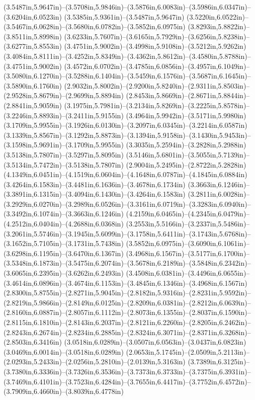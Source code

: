 (3.5487in,5.9647in)--(3.5708in,5.9846in)--(3.5876in,6.0083in)--(3.5986in,6.0347in)--(3.6204in,6.0523in) (3.5385in,5.9361in)--(3.5487in,5.9647in) (3.5220in,6.0522in)--(3.5467in,6.0628in)--(3.5680in,6.0782in)--(3.5852in,6.0975in) (3.8293in,5.8822in)--(3.8511in,5.8998in) (3.6233in,5.7607in)--(3.6165in,5.7929in)--(3.6256in,5.8238in)--(3.6277in,5.8553in) (3.4751in,5.9002in)--(3.4998in,5.9108in)--(3.5212in,5.9262in) (3.4084in,5.8111in)--(3.4252in,5.8349in)--(3.4362in,5.8612in)--(3.4580in,5.8788in)--(3.4751in,5.9002in) (3.4572in,6.0702in)--(3.4785in,6.0856in)--(3.4957in,6.1049in)--(3.5080in,6.1270in)--(3.5288in,6.1404in)--(3.5459in,6.1576in)--(3.5687in,6.1645in)--(3.5890in,6.1760in) (2.9032in,5.8002in)--(2.9200in,5.8240in)--(2.9311in,5.8503in)--(2.9528in,5.8679in)--(2.9699in,5.8894in) (2.8453in,5.8669in)--(2.8671in,5.8844in)--(2.8841in,5.9059in) (3.1975in,5.7981in)--(3.2134in,5.8269in)--(3.2225in,5.8578in)--(3.2246in,5.8893in)--(3.2411in,5.9155in) (3.4964in,5.9942in)--(3.5171in,5.9980in) (3.1709in,5.9955in)--(3.1926in,6.0130in)--(3.2097in,6.0345in)--(3.2214in,6.0587in) (3.1339in,5.8567in)--(3.1292in,5.8873in)--(3.1394in,5.9158in)--(3.1430in,5.9453in)--(3.1598in,5.9691in)--(3.1709in,5.9955in) (3.3035in,5.2594in)--(3.2828in,5.2988in) (3.5138in,5.7807in)--(3.5297in,5.8095in) (3.5146in,5.6801in)--(3.5055in,5.7139in)--(3.5134in,5.7472in)--(3.5138in,5.7807in) (2.9004in,5.2495in)--(2.8722in,5.2828in) (4.1349in,6.0451in)--(4.1519in,6.0604in)--(4.1648in,6.0787in)--(4.1845in,6.0884in) (3.4264in,6.1583in)--(3.4481in,6.1636in)--(3.4678in,6.1734in) (3.3663in,6.1246in)--(3.3891in,6.1315in)--(3.4094in,6.1430in)--(3.4264in,6.1583in) (3.2811in,6.0028in)--(3.2929in,6.0270in)--(3.2989in,6.0526in)--(3.3161in,6.0719in)--(3.3283in,6.0940in)--(3.3492in,6.1074in)--(3.3663in,6.1246in) (4.2159in,6.0465in)--(4.2345in,6.0479in)--(4.2512in,6.0404in)--(4.2688in,6.0368in) (3.2553in,5.5166in)--(3.2337in,5.5486in)--(3.2061in,5.5746in)--(3.1945in,5.6099in)--(3.1758in,5.6411in)--(3.1743in,5.6768in)--(3.1652in,5.7105in)--(3.1731in,5.7438in) (3.5852in,6.0975in)--(3.6090in,6.1061in)--(3.6298in,6.1195in)--(3.6470in,6.1367in) (3.4968in,6.1567in)--(3.5177in,6.1700in)--(3.5348in,6.1873in)--(3.5475in,6.2074in)--(3.5678in,6.2189in)--(3.5848in,6.2342in)--(3.6065in,6.2395in)--(3.6262in,6.2493in) (3.4508in,6.0381in)--(3.4496in,6.0655in)--(3.4614in,6.0896in)--(3.4674in,6.1153in)--(3.4845in,6.1346in)--(3.4968in,6.1567in) (2.8300in,5.8755in)--(2.8271in,5.9045in)--(2.8182in,5.9316in)--(2.8231in,5.9592in)--(2.8219in,5.9866in)--(2.8149in,6.0125in)--(2.8209in,6.0381in)--(2.8212in,6.0639in)--(2.8160in,6.0887in)--(2.8057in,6.1112in)--(2.8073in,6.1355in)--(2.8037in,6.1590in)--(2.8115in,6.1810in)--(2.8143in,6.2037in)--(2.8121in,6.2260in)--(2.8205in,6.2462in)--(2.8243in,6.2674in)--(2.8234in,6.2885in)--(2.8324in,6.3071in)--(2.8371in,6.3268in)--(2.8503in,6.3416in) (3.0518in,6.0289in)--(3.0507in,6.0563in)--(3.0437in,6.0823in) (3.0469in,6.0014in)--(3.0518in,6.0289in) (2.0653in,5.1745in)--(2.0509in,5.2113in)--(2.0293in,5.2433in)--(2.0256in,5.2810in)--(2.0139in,5.3163in) (3.7389in,6.3125in)--(3.7380in,6.3336in)--(3.7326in,6.3536in)--(3.7373in,6.3733in)--(3.7375in,6.3931in)--(3.7469in,6.4101in)--(3.7523in,6.4284in)--(3.7655in,6.4417in)--(3.7752in,6.4572in)--(3.7909in,6.4660in)--(3.8039in,6.4778in) 